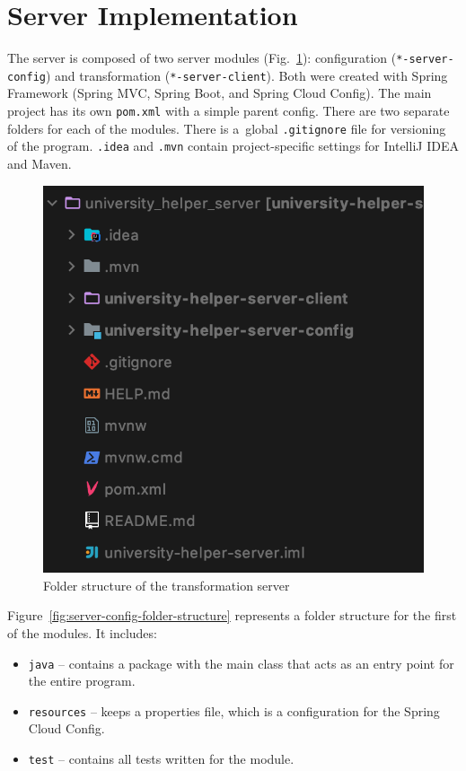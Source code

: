 

\section{Server Implementation}
The server is composed of two server modules (Fig.~\ref{fig:server-folder-structure}): configuration (\texttt{*-server-config}) and transformation (\texttt{*-server-client}). Both were created with Spring Framework (Spring MVC, Spring Boot, and Spring Cloud Config). The main project has its own \texttt{pom.xml} with a simple parent config. There are two separate folders for each of the modules. There is a~global \texttt{.gitignore} file for versioning of the program. \texttt{.idea} and \texttt{.mvn} contain project-specific settings for IntelliJ IDEA and Maven.

\begin{figure}[htb]
    \centering
    \includegraphics[width=.44\linewidth]{fig04/server-folder-structure.png}
    \caption{Folder structure of the transformation server}
    \label{fig:server-folder-structure}
\end{figure}

Figure~\ref{fig:server-config-folder-structure} represents a folder structure for the first of the modules. It includes:
\begin{itemize}
    \item \texttt{java} -- contains a package with the main class that acts as an entry point for the entire program.
    \item \texttt{resources} -- keeps a properties file, which is a configuration for the Spring Cloud Config.
    \item \texttt{test} -- contains all tests written for the module.
\end{itemize}

